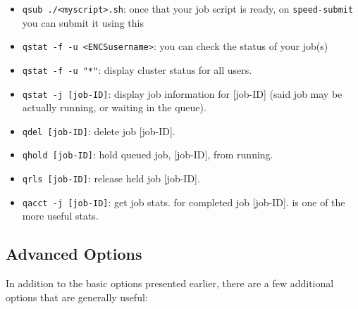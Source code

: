 \documentclass{easychair}
\begin{document}
\begin{itemize}
\item
\texttt{qsub ./<myscript>.sh}: once that your job script is ready,
on \texttt{speed-submit} you can submit it using this

\item
\texttt{qstat -f -u <ENCSusername>}: you can check the status of your job(s)

\item
\texttt{qstat -f -u "*"}: display cluster status for all users. 

\item
\texttt{qstat -j [job-ID]}: display job information for [job-ID] (said job may be actually running, or waiting in the queue). 

\item
\texttt{qdel [job-ID]}: delete job [job-ID]. 

\item
\texttt{qhold [job-ID]}: hold queued job, [job-ID], from running. 

\item
\texttt{qrls [job-ID]}: release held job [job-ID]. 

\item
\texttt{qacct -j [job-ID]}: get job stats. for completed job [job-ID].  is one of the more useful stats. 
\end{itemize}


\subsection{Advanced  Options}
\label{sect:qsub-options}

In addition to the basic  options presented earlier, there are a 
few additional options that are generally useful:
\end{document}
